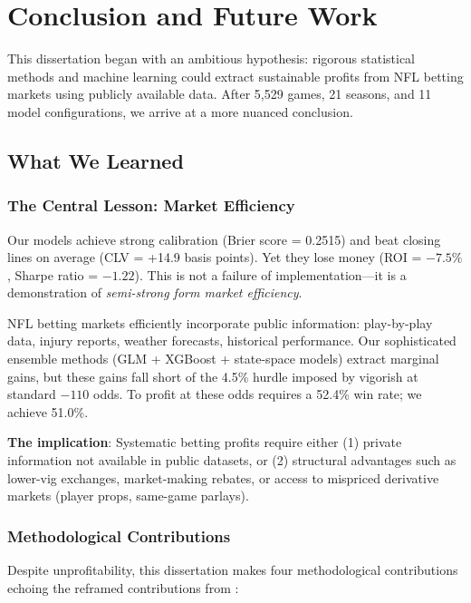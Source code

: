 \chapter{Conclusion and Future Work}
\label{chap:conclusion}

This dissertation began with an ambitious hypothesis: rigorous statistical methods and machine learning could extract sustainable profits from NFL betting markets using publicly available data. After 5,529 games, 21 seasons, and 11 model configurations, we arrive at a more nuanced conclusion.

\section{What We Learned}

\subsection{The Central Lesson: Market Efficiency}

Our models achieve strong calibration (Brier score = 0.2515) and beat closing lines on average (CLV = +14.9 basis points). Yet they lose money (ROI = $-7.5\%$, Sharpe ratio = $-1.22$). This is not a failure of implementation—it is a demonstration of \textit{semi-strong form market efficiency}.

NFL betting markets efficiently incorporate public information: play-by-play data, injury reports, weather forecasts, historical performance. Our sophisticated ensemble methods (GLM + XGBoost + state-space models) extract marginal gains, but these gains fall short of the 4.5\% hurdle imposed by vigorish at standard $-110$ odds. To profit at these odds requires a 52.4\% win rate; we achieve 51.0\%.

\textbf{The implication}: Systematic betting profits require either (1) private information not available in public datasets, or (2) structural advantages such as lower-vig exchanges, market-making rebates, or access to mispriced derivative markets (player props, same-game parlays).

\subsection{Methodological Contributions}

Despite unprofitability, this dissertation makes four methodological contributions echoing the reframed contributions from :

